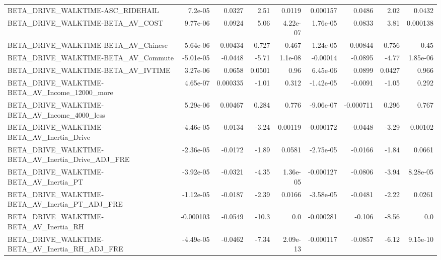 \begin{tabular}{lrrrrrrrr}
BETA\_DRIVE\_WALKTIME-ASC\_RIDEHAIL                   &     7.2e-05 &       0.0327 &     2.51 &   0.0119 &   0.000157 &      0.0486 &         2.02 &        0.0432 \\
BETA\_DRIVE\_WALKTIME-BETA\_AV\_COST                   &    9.77e-06 &       0.0924 &     5.06 & 4.22e-07 &   1.76e-05 &      0.0833 &         3.81 &      0.000138 \\
BETA\_DRIVE\_WALKTIME-BETA\_AV\_Chinese                &    5.64e-06 &      0.00434 &    0.727 &    0.467 &   1.24e-05 &     0.00844 &        0.756 &          0.45 \\
BETA\_DRIVE\_WALKTIME-BETA\_AV\_Commute                &   -5.01e-05 &      -0.0448 &    -5.71 &  1.1e-08 &   -0.00014 &     -0.0895 &        -4.77 &      1.85e-06 \\
BETA\_DRIVE\_WALKTIME-BETA\_AV\_IVTIME                 &    3.27e-06 &       0.0658 &   0.0501 &     0.96 &   6.45e-06 &      0.0899 &       0.0427 &         0.966 \\
BETA\_DRIVE\_WALKTIME-BETA\_AV\_Income\_12000\_more      &    4.65e-07 &     0.000335 &    -1.01 &    0.312 &  -1.42e-05 &     -0.0091 &        -1.05 &         0.292 \\
BETA\_DRIVE\_WALKTIME-BETA\_AV\_Income\_4000\_less       &    5.29e-06 &      0.00467 &    0.284 &    0.776 &  -9.06e-07 &   -0.000711 &        0.296 &         0.767 \\
BETA\_DRIVE\_WALKTIME-BETA\_AV\_Inertia\_Drive          &   -4.46e-05 &      -0.0134 &    -3.24 &  0.00119 &  -0.000172 &     -0.0448 &        -3.29 &       0.00102 \\
BETA\_DRIVE\_WALKTIME-BETA\_AV\_Inertia\_Drive\_ADJ\_FRE  &   -2.36e-05 &      -0.0172 &    -1.89 &   0.0581 &  -2.75e-05 &     -0.0166 &        -1.84 &        0.0661 \\
BETA\_DRIVE\_WALKTIME-BETA\_AV\_Inertia\_PT             &   -3.92e-05 &      -0.0321 &    -4.35 & 1.36e-05 &  -0.000127 &     -0.0806 &        -3.94 &      8.28e-05 \\
BETA\_DRIVE\_WALKTIME-BETA\_AV\_Inertia\_PT\_ADJ\_FRE     &   -1.12e-05 &      -0.0187 &    -2.39 &   0.0166 &  -3.58e-05 &     -0.0481 &        -2.22 &        0.0261 \\
BETA\_DRIVE\_WALKTIME-BETA\_AV\_Inertia\_RH             &   -0.000103 &      -0.0549 &    -10.3 &      0.0 &  -0.000281 &      -0.106 &        -8.56 &           0.0 \\
BETA\_DRIVE\_WALKTIME-BETA\_AV\_Inertia\_RH\_ADJ\_FRE     &   -4.49e-05 &      -0.0462 &    -7.34 & 2.09e-13 &  -0.000117 &     -0.0857 &        -6.12 &      9.15e-10 \\

\end{tabular}
